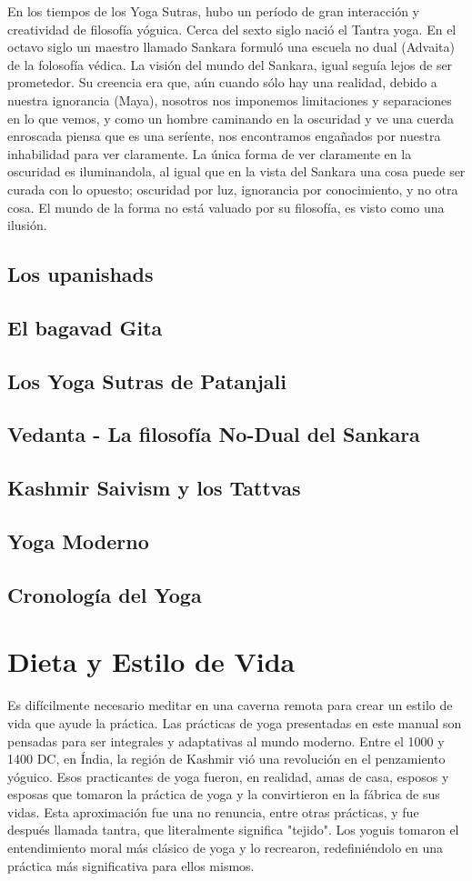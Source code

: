 En los tiempos de los Yoga Sutras, hubo un período de gran interacción y creatividad de filosofía yóguica. Cerca del sexto siglo nació el Tantra yoga. En el octavo siglo un maestro llamado Sankara formuló una escuela no dual (Advaita) de la folosofía v\'edica. La visión del mundo del Sankara, igual seguía lejos de ser prometedor. Su creencia era que, aún cuando sólo hay una realidad, debido a nuestra ignorancia (Maya), nosotros nos imponemos limitaciones y separaciones en lo que vemos, y como un hombre caminando en la oscuridad y ve una cuerda enroscada piensa que es una seríente, nos encontramos engañados por nuestra inhabilidad para ver claramente. La única forma de ver claramente en la oscuridad es iluminandola, al igual que en la vista del Sankara una cosa puede ser curada con lo opuesto; oscuridad por luz, ignorancia por conocimiento, y no otra cosa. El mundo de la forma no está valuado por su filosofía, es visto como una ilusión.

\subsection{Los upanishads}
\subsection{El bagavad Gita}
\subsection{Los Yoga Sutras de Patanjali}
\subsection{Vedanta - La filosofía No-Dual del Sankara}
\subsection{Kashmir Saivism y los Tattvas}
\subsection{Yoga Moderno}
\subsection{Cronología del Yoga}
\section{Dieta y Estilo de Vida}
Es difícilmente necesario meditar en una caverna remota para crear un estilo de vida que ayude la práctica. Las prácticas de yoga presentadas en este manual son pensadas para ser integrales y adaptativas al mundo moderno. Entre el 1000 y 1400 DC, en Índia, la región de Kashmir vió una revolución en el penzamiento yóguico. Esos practicantes de yoga fueron, en realidad, amas de casa, esposos y esposas que tomaron la práctica de yoga y la convirtieron en la fábrica de sus vidas. Esta aproximación fue una no renuncia, entre otras prácticas, y fue después llamada tantra, que literalmente significa "tejido". Los yoguis tomaron el entendimiento moral más clásico de yoga y lo recrearon, redefiniéndolo en una práctica más significativa para ellos mismos.

